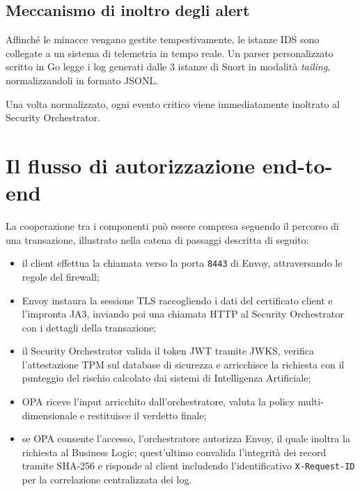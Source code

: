 \subsection{Meccanismo di inoltro degli alert}
\label{sec:idsorchestrator}
Affinché le minacce vengano gestite tempestivamente, le istanze IDS sono collegate a un sistema di telemetria in tempo reale. Un parser personalizzato scritto in Go legge i log generati dalle 3 istanze di Snort in modalità \textit{tailing}, normalizzandoli in formato JSONL. 

Una volta normalizzato, ogni evento critico viene immediatamente inoltrato al Security Orchestrator.


\section{Il flusso di autorizzazione end-to-end}

La cooperazione tra i componenti può essere compresa seguendo il percorso di una transazione, illustrato nella catena di passaggi descritta di seguito:

\begin{itemize}
\item il client effettua la chiamata verso la porta \texttt{8443} di Envoy, attraversando le regole del firewall;

\item Envoy instaura la sessione TLS raccogliendo i dati del certificato client e l'impronta JA3, inviando poi una chiamata HTTP al Security Orchestrator con i dettagli della transazione;

\item il Security Orchestrator valida il token JWT tramite JWKS, verifica l'attestazione TPM sul database di sicurezza e arricchisce la richiesta con il punteggio del rischio calcolato dai sistemi di Intelligenza Artificiale;

\item OPA riceve l'input arricchito dall'orchestratore, valuta la policy multi-dimensionale e restituisce il verdetto finale;

\item se OPA consente l'accesso, l'orchestratore autorizza Envoy, il quale inoltra la richiesta al Business Logic; quest'ultimo convalida l'integrità dei record tramite SHA-256 e risponde al client includendo l'identificativo \texttt{X-Request-ID} per la correlazione centralizzata dei log.
\end{itemize}